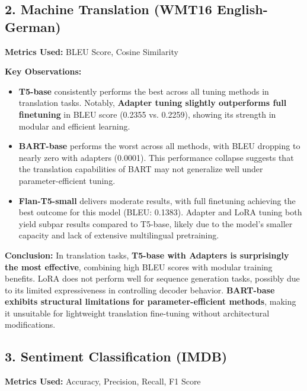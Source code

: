 \subsection*{2. Machine Translation (WMT16 English-German)}
\textbf{Metrics Used:} BLEU Score, Cosine Similarity

\textbf{Key Observations:}
\begin{itemize}
    \item \textbf{T5-base} consistently performs the best across all tuning methods in translation tasks. Notably, \textbf{Adapter tuning slightly outperforms full finetuning} in BLEU score (0.2355 vs. 0.2259), showing its strength in modular and efficient learning.
    
    \item \textbf{BART-base} performs the worst across all methods, with BLEU dropping to nearly zero with adapters (0.0001). This performance collapse suggests that the translation capabilities of BART may not generalize well under parameter-efficient tuning.
    
    \item \textbf{Flan-T5-small} delivers moderate results, with full finetuning achieving the best outcome for this model (BLEU: 0.1383). Adapter and LoRA tuning both yield subpar results compared to T5-base, likely due to the model’s smaller capacity and lack of extensive multilingual pretraining.
\end{itemize}

\textbf{Conclusion:} 
In translation tasks, \textbf{T5-base with Adapters is surprisingly the most effective}, combining high BLEU scores with modular training benefits. LoRA does not perform well for sequence generation tasks, possibly due to its limited expressiveness in controlling decoder behavior. \textbf{BART-base exhibits structural limitations for parameter-efficient methods}, making it unsuitable for lightweight translation fine-tuning without architectural modifications.

\subsection*{3. Sentiment Classification (IMDB)}
\textbf{Metrics Used:} Accuracy, Precision, Recall, F1 Score

